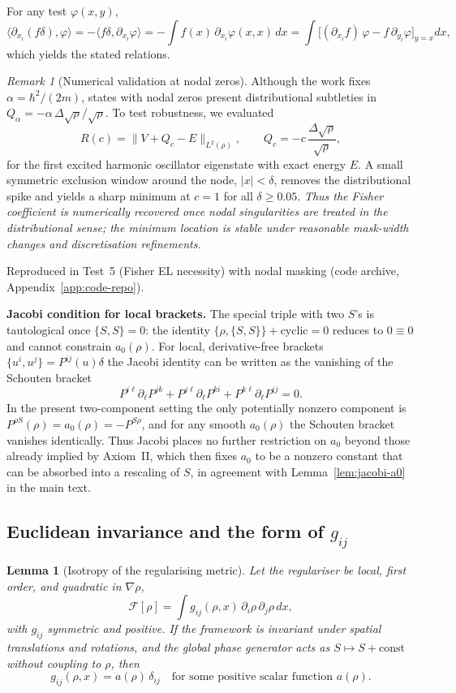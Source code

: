 \documentclass[11pt,a4paper]{article}
\numberwithin{equation}{section}
\theoremstyle{thmcompact}
\newtheorem{lemma}[theorem]{Lemma}
\theoremstyle{remark}
\newtheorem*{remarkplain}{Remark}
\newenvironment{remark}[1][]%
{\begin{remarkbox}\begin{remarkplain}[#1]\normalfont}
		{\end{remarkplain}\end{remarkbox}}
\begin{document}
		For any test $\varphi(x,y)$,
		\[
		\langle\partial_{x_i}(f\delta),\varphi\rangle
		=-\langle f\delta,\partial_{x_i}\varphi\rangle
		=-\!\int f(x)\,\partial_{x_i}\varphi(x,x)\,dx
		=\!\int \Big[(\partial_{x_i}f)\,\varphi
		-f\,\partial_{y_i}\varphi\Big]_{y=x}\!dx,
		\]
		which yields the stated relations.
	
	\begin{remark}[Numerical validation at nodal zeros]
		Although the work fixes $\alpha=\hbar^2/(2m)$,
		states with nodal zeros present distributional subtleties in $Q_\alpha=-\alpha\,\Delta\sqrt\rho/\sqrt\rho$.
		To test robustness, we evaluated
		\[
		R(c)=\bigl\|V+Q_c-E\bigr\|_{L^2(\rho)},\qquad
		Q_c=-c\,\frac{\Delta\sqrt\rho}{\sqrt\rho},
		\]
		for the first excited harmonic oscillator eigenstate with exact energy $E$.
		A small symmetric exclusion window around the node,
		$|x|<\delta$, removes the distributional spike and yields a sharp minimum at $c=1$
		for all $\delta \ge 0.05$.
\textit{Thus the Fisher coefficient is numerically recovered once nodal singularities are treated in the distributional sense; the minimum location is stable under reasonable mask-width changes and discretisation refinements.}

	\end{remark}		
Reproduced in Test~5 (Fisher EL necessity) with nodal masking (code archive, Appendix~\ref{app:code-repo}).

	
\textbf{Jacobi condition for local brackets.}
The special triple with two $S$'s is tautological once $\{S,S\}=0$: the identity $\{\rho,\{S,S\}\}+\mathrm{cyclic}=0$ reduces to $0\equiv 0$ and cannot constrain $a_0(\rho)$. For local, derivative-free brackets $\{u^i,u^j\}=P^{ij}(u)\delta$ the Jacobi identity can be written as the vanishing of the Schouten bracket
\[
P^{i\ell}\partial_\ell P^{jk}+P^{j\ell}\partial_\ell P^{ki}+P^{k\ell}\partial_\ell P^{ij}=0.
\]
In the present two-component setting the only potentially nonzero component is $P^{\rho S}(\rho)=a_0(\rho)=-P^{S\rho}$, and for any smooth $a_0(\rho)$ the Schouten bracket vanishes identically. Thus Jacobi places no further restriction on $a_0$ beyond those already implied by Axiom~II, which then fixes $a_0$ to be a nonzero constant that can be absorbed into a rescaling of $S$, in agreement with Lemma~\ref{lem:jacobi-a0} in the main text.
	
\subsection*{Euclidean invariance and the form of $g_{ij}$}\label{app:euclid-gij}
\begin{lemma}[Isotropy of the regularising metric]\label{lem:gijdelta}
	Let the regulariser be local, first order, and quadratic in $\nabla\rho$,
	\[
	\mathcal{F}[\rho]=\int g_{ij}(\rho,x)\,\partial_i\rho\,\partial_j\rho\,dx,
	\]
	with $g_{ij}$ symmetric and positive. If the framework is invariant under spatial translations and rotations, and the global phase generator acts as $S\mapsto S+\mathrm{const}$ without coupling to $\rho$, then
	\[
	g_{ij}(\rho,x)=a(\rho)\,\delta_{ij}
	\quad\text{for some positive scalar function }a(\rho).
	\]
\end{lemma}
\end{document}
